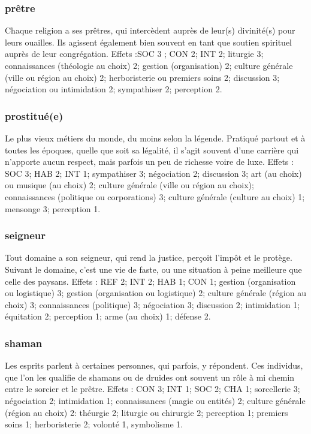 \documentclass[10pt,a4paper,twocolumn]{book}
\begin{document}
\subsubsection{prêtre}
Chaque religion a ses prêtres, qui intercèdent auprès de leur(s) divinité(s) pour leurs ouailles. Ils agissent également bien souvent en tant que soutien spirituel auprès de leur congrégation.
Effets :SOC 3 ; CON 2; INT 2; liturgie 3; connaissances (théologie au choix) 2; gestion (organisation) 2; culture générale (ville ou région au choix) 2; herboristerie ou premiers soins 2; discussion 3; négociation ou intimidation 2; sympathiser 2; perception 2.
\subsubsection{prostitué(e)}
Le plus vieux métiers du monde, du moins selon la légende. Pratiqué partout et à toutes les époques, quelle que soit sa légalité, il s’agit souvent d’une carrière qui n’apporte aucun respect, mais parfois un peu de richesse voire de luxe. 
Effets : SOC 3; HAB 2; INT 1; sympathiser 3; négociation 2; discussion 3; art (au choix) ou musique (au choix) 2; culture générale (ville ou région au choix); connaissances (politique ou corporations) 3; culture générale (culture au choix) 1; mensonge 3; perception 1.
\subsubsection{seigneur}
Tout domaine a son seigneur, qui rend la justice, perçoit l’impôt et le protège. Suivant le domaine, c’est une vie de faste, ou une situation à peine meilleure que celle des paysans.
Effets : REF 2; INT 2; HAB 1; CON 1; gestion (organisation ou logistique) 3; gestion (organisation ou logistique) 2; culture générale (région au choix) 3; connaissances (politique) 3; négociation 3; discussion 2; intimidation 1; équitation 2; perception 1; arme (au choix) 1; défense 2.
\subsubsection{shaman}
Les esprits parlent à certaines personnes, qui parfois, y répondent. Ces individus, que l'on les qualifie de shamans ou de druides ont souvent un rôle à mi chemin entre le sorcier et le prêtre.
Effets : CON 3; INT 1; SOC 2; CHA 1; sorcellerie 3; négociation 2; intimidation 1; connaissances (magie ou entités) 2; culture générale (région au choix) 2: théurgie 2; liturgie ou chirurgie 2; perception 1; premiers soins 1; herboristerie 2; volonté 1, symbolisme 1.
\end{document}
